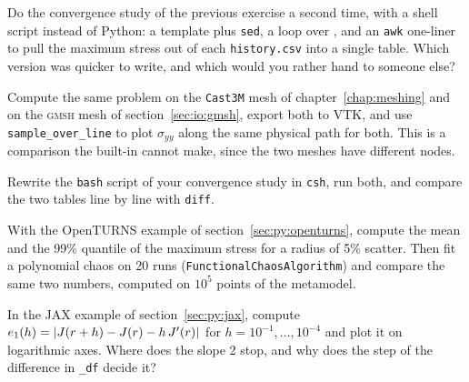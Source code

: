  Do the convergence study of the
  previous exercise a second time, with a shell script instead of Python:
  a template plus \texttt{sed}, a loop over , and an \texttt{awk}
  one-liner to pull the maximum stress out of each \texttt{history.csv} into
  a single table. Which version was quicker to write, and which would you
  rather hand to someone else?

 Compute the same problem on the
  \texttt{Cast3M} mesh of chapter~\ref{chap:meshing} and on the
  \textsc{gmsh} mesh of section~\ref{sec:io:gmsh}, export both to VTK, and use
  \texttt{sample\_over\_line} to plot $\sigma_{yy}$ along the same physical
  path for both. This is a comparison the built-in  cannot make,
  since the two meshes have different nodes.

 Rewrite the \texttt{bash} script of your
  convergence study in \texttt{csh}, run both, and compare the two tables
  line by line with \texttt{diff}.

 With the OpenTURNS example of
  section~\ref{sec:py:openturns}, compute the mean and the 99\% quantile of the
  maximum stress for a radius of 5\% scatter. Then fit a polynomial chaos on
  20 runs (\texttt{FunctionalChaosAlgorithm}) and compare the same two
  numbers, computed on $10^5$ points of the metamodel.

 In the JAX example of
  section~\ref{sec:py:jax}, compute $e_1(h)=\lvert J(r+h)-J(r)-h\,J'(r)\rvert$ for
  $h=10^{-1},\dots,10^{-4}$ and plot it on logarithmic axes. Where does the
  slope 2 stop, and why does the step of the difference in \texttt{\_df}
  decide it?
